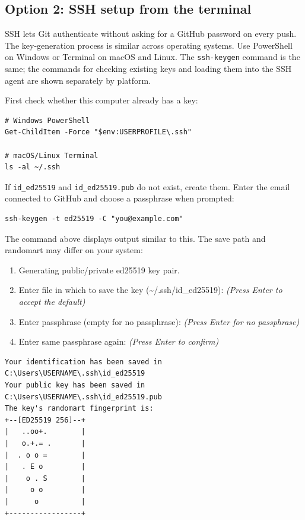 \subsection{Option 2: SSH setup from the terminal}

SSH lets Git authenticate without asking for a GitHub password on every push.
The key-generation process is similar across operating systems. Use PowerShell on Windows or Terminal on macOS and Linux. The \texttt{ssh-keygen} command is the same; the commands for checking existing keys and loading them into the SSH agent are shown separately by platform.

First check whether this computer already has a key:

\begin{lstlisting}[style=utpterminal]
# Windows PowerShell
Get-ChildItem -Force "$env:USERPROFILE\.ssh"

# macOS/Linux Terminal
ls -al ~/.ssh
\end{lstlisting}

If \texttt{id\_ed25519} and \texttt{id\_ed25519.pub} do not exist, create them.
Enter the email connected to GitHub and choose a passphrase when prompted:

\begin{lstlisting}[style=utpterminal]
ssh-keygen -t ed25519 -C "you@example.com"
\end{lstlisting}

The command above displays output similar to this. The save path and randomart may differ on your system:

\begin{enumerate}[leftmargin=1.7em]
  \item Generating public/private ed25519 key pair.
  \item Enter file in which to save the key (\textasciitilde/.ssh/id\_ed25519): \textit{(Press Enter to accept the default)}
  \item Enter passphrase (empty for no passphrase): \textit{(Press Enter for no passphrase)}
  \item Enter same passphrase again: \textit{(Press Enter to confirm)}
\end{enumerate}

\begin{lstlisting}[style=utpterminal]
Your identification has been saved in C:\Users\USERNAME\.ssh\id_ed25519
Your public key has been saved in C:\Users\USERNAME\.ssh\id_ed25519.pub
The key's randomart fingerprint is:
+--[ED25519 256]--+
|   ..oo+.        |
|   o.+.= .       |
|  . o o =        |
|   . E o         |
|    o . S        |
|     o o         |
|      o          |
+-----------------+
\end{lstlisting}

